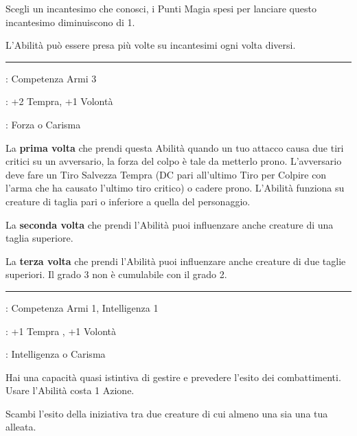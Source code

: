 \begin{multicols}{2}
Scegli un incantesimo che conosci, i Punti Magia spesi per lanciare questo incantesimo diminuiscono di 1.

L'Abilità può essere presa più volte su incantesimi ogni volta diversi.

\smallskip\noindent\rule{\linewidth}{2pt} \hypertarget{Stai giù!}{}\medskip{}
\noindent
\begin{description}[noitemsep, topsep=0pt, parsep=0pt, partopsep=0pt, leftmargin=0cm, labelwidth=2.5cm]
    \item[\textbf{Requisito}]: Competenza Armi 3
    \item[\textbf{Tiri Salvezza}]: +2 Tempra, +1 Volontà
    \item[\textbf{Caratteristica}]: Forza o Carisma
\end{description}

La \textbf{prima volta} che prendi questa Abilità quando un tuo attacco causa due tiri critici su un avversario, la forza del colpo è tale da metterlo prono. L'avversario deve fare un Tiro Salvezza Tempra (DC pari all'ultimo Tiro per Colpire con l'arma che ha causato l'ultimo tiro critico) o cadere prono. L'Abilità funziona su creature di taglia pari o inferiore a quella del personaggio.

La \textbf{seconda volta} che prendi l'Abilità puoi influenzare anche creature di una taglia superiore.

La \textbf{terza volta} che prendi l'Abilità puoi influenzare anche creature di due taglie superiori. Il grado 3 non è cumulabile con il grado 2.

\smallskip\noindent\rule{\linewidth}{2pt} \hypertarget{Tattico}{}\medskip{}
\noindent
\begin{description}[noitemsep, topsep=0pt, parsep=0pt, partopsep=0pt, leftmargin=0cm, labelwidth=2.5cm]
    \item[\textbf{Requisito}]: Competenza Armi 1, Intelligenza 1
    \item[\textbf{Tiri Salvezza}]: +1 Tempra , +1 Volontà
    \item[\textbf{Caratteristica}]: Intelligenza o Carisma
\end{description}

Hai una capacità quasi istintiva di gestire e prevedere l'esito dei combattimenti. Usare l'Abilità costa 1 Azione.

Scambi l'esito della iniziativa tra due creature di cui almeno una sia una tua alleata.


\end{multicols}
